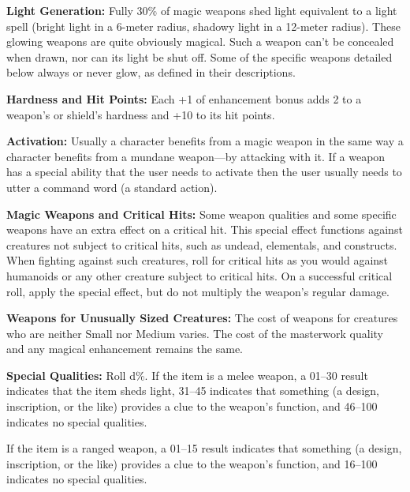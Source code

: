 \textbf{Light Generation:} Fully 30\% of magic weapons shed light equivalent to a light spell (bright light in a 6-meter radius, shadowy light in a 12-meter radius). These glowing weapons are quite obviously magical. Such a weapon can't be concealed when drawn, nor can its light be shut off. Some of the specific weapons detailed below always or never glow, as defined in their descriptions.

\textbf{Hardness and Hit Points:} Each +1 of enhancement bonus adds 2 to a weapon's or shield's hardness and +10 to its hit points.

\textbf{Activation:} Usually a character benefits from a magic weapon in the same way a character benefits from a mundane weapon---by attacking with it. If a weapon has a special ability that the user needs to activate then the user usually needs to utter a command word (a standard action).

\textbf{Magic Weapons and Critical Hits:} Some weapon qualities and some specific weapons have an extra effect on a critical hit. This special effect functions against creatures not subject to critical hits, such as undead, elementals, and constructs. When fighting against such creatures, roll for critical hits as you would against humanoids or any other creature subject to critical hits. On a successful critical roll, apply the special effect, but do not multiply the weapon's regular damage.

\textbf{Weapons for Unusually Sized Creatures:} The cost of weapons for creatures who are neither Small nor Medium varies. The cost of the masterwork quality and any magical enhancement remains the same.

\textbf{Special Qualities:} Roll d\%. If the item is a melee weapon, a 01--30 result indicates that the item sheds light, 31--45 indicates that something (a design, inscription, or the like) provides a clue to the weapon's function, and 46--100 indicates no special qualities.

If the item is a ranged weapon, a 01--15 result indicates that something (a design, inscription, or the like) provides a clue to the weapon's function, and 16--100 indicates no special qualities.


